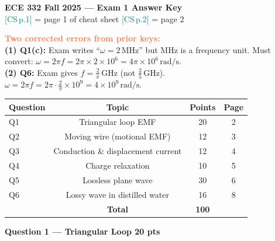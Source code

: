 \documentclass[11pt,letterpaper]{article}
\begin{document}
\begin{center}
{\Large\textbf{ECE 332 Fall 2025 --- Exam 1 Answer Key}}\\[6pt]
{\small\textcolor{teal}{[CS\,p.1]} = page 1 of cheat sheet \quad
       \textcolor{teal}{[CS\,p.2]} = page 2}
\end{center}

\vspace{4pt}
\begin{notebox}
\textbf{\textcolor{coral}{Two corrected errors from prior keys:}}\\[2pt]
\textbf{(1) Q1(c):} Exam writes ``$\omega=2\,\text{MHz}$'' but MHz is a frequency unit.
Must convert: $\omega=2\pi f=2\pi\times2\times10^6=4\pi\times10^6\,\text{rad/s}$.\\[2pt]
\textbf{(2) Q6:} Exam gives $f=\tfrac{2}{\pi}\,\text{GHz}$ (not $\tfrac{2}{5}$\,GHz).
$\omega=2\pi f=2\pi\cdot\tfrac{2}{\pi}\times10^9=4\times10^9\,\text{rad/s}$.
\end{notebox}

\vspace{6pt}
\begin{center}
\renewcommand{\arraystretch}{1.3}
\begin{tabular}{@{}lccc@{}}
\toprule
Question & Topic & Points & Page\\
\midrule
Q1 & Triangular loop EMF & 20 & 2\\
Q2 & Moving wire (motional EMF) & 12 & 3\\
Q3 & Conduction \& displacement current & 12 & 4\\
Q4 & Charge relaxation & 10 & 5\\
Q5 & Lossless plane wave & 30 & 6\\
Q6 & Lossy wave in distilled water & 16 & 8\\
\midrule
 & \textbf{Total} & \textbf{100} &\\
\bottomrule
\end{tabular}
\end{center}

\newpage
\colorbox{purplebg}{\parbox{\dimexpr\linewidth-2\fboxsep}{\color{purple}\large\textbf{Question 1 --- Triangular Loop \hfill 20 pts}}}
\end{document}
